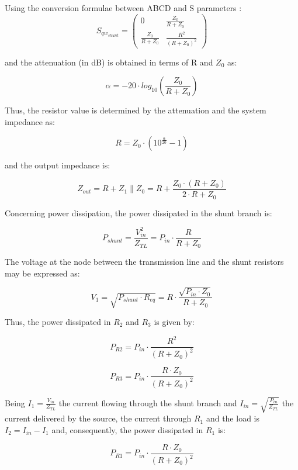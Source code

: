 \noindent Using the conversion formulae between ABCD and S parameters \cite{pozar2012microwave}:
\begin{equation}
	S_{qw_{shunt}} = \begin{pmatrix}
							0 & \frac{Z_0}{R + Z_0}\\
							\frac{Z_0}{R+Z_0}  & \frac{R^2}{(R+Z_0)^2}
					 \end{pmatrix}
\end{equation}

\noindent and the attenuation (in dB) is obtained in terms of R and $Z_0$ as:

\begin{equation}
	\alpha = -20 \cdot log_{10} \left( \frac{Z_0}{R + Z_0}\right)
\end{equation}

\noindent Thus, the resistor value is determined by the attenuation and the system impedance as:

\begin{equation}
 	R = Z_0 \cdot \left( 10^{\frac{\alpha}{20}} - 1 \right)
\end{equation}

\noindent and the output impedance is:

\begin{equation}
	Z_{out} = R + Z_1 \parallel Z_0 = R + \frac{Z_0 \cdot (R + Z_0)}{2 \cdot R + Z_0}
\end{equation}

\noindent Concerning power dissipation, the power dissipated in the shunt branch is:

\begin{equation}
	P_{shunt} = \frac{V_{in}^2}{Z_{TL}} = P_{in} \cdot \frac{R}{R+Z_0}
\end{equation}

\noindent The voltage at the node between the transmission line and the shunt resistors may be expressed as:

\begin{equation}
	V_{1} = \sqrt{P_{shunt} \cdot R_{eq}} = R \cdot \frac{\sqrt{P_{in} \cdot Z_0}}{R + Z_0}
\end{equation}

\noindent Thus, the power dissipated in $R_2$ and $R_3$ is given by:

\begin{equation}
	P_{R2} = P_{in} \cdot \frac{R^2}{(R + Z_0)^2}
\end{equation}

\begin{equation}
	P_{R3} = P_{in} \cdot \frac{R \cdot Z_0}{(R + Z_0)^2}
\end{equation}

\noindent Being $I_1 = \frac{V_{in}}{Z_{TL}}$ the current flowing through the shunt branch and $I_{in} = \sqrt{\frac{P_{in}}{Z_{TL}}}$ the current delivered by the source, the current through $R_1$ and the load is $I_2 = I_{in} - I_1$ and, consequently, the power dissipated in $R_1$ is:

\begin{equation}
	P_{R1} = P_{in} \cdot \frac {R \cdot Z_0}{(R+Z_0)^2}
\end{equation}